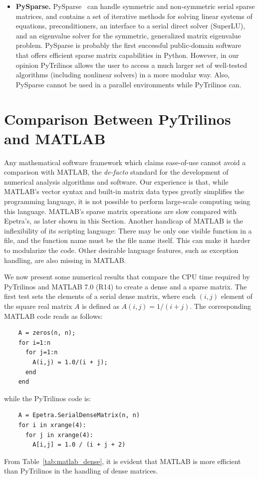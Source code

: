 \documentclass[acmtocl]{acmtrans2m}
\begin{document}
\begin{itemize}
  {\bf Why aren't we using ScientificPython?}

\item {\bf PySparse.}  PySparse~\cite{broker05using} can handle
  symmetric and non-symmetric serial sparse matrices, and contains a
  set of iterative methods for solving linear systems of equations,
  preconditioners, an interface to a serial direct solver (SuperLU),
  and an eigenvalue solver for the symmetric, generalized matrix
  eigenvalue problem.  PySparse is probably the first successful
  public-domain software that offers efficient sparse matrix
  capabilities in Python. However, in our opinion PyTrilinos allows
  the user to access a much larger set of well-tested algorithms
  (including nonlinear solvers) in a more modular way.  Also,
  PySparse cannot be used in a parallel environments while PyTrilinos
  can.

\end{itemize}

\section{Comparison Between PyTrilinos and MATLAB}
\label{sec:comparison_matlab}

Any mathematical software framework which claims ease-of-use cannot
avoid a comparison with MATLAB, the {\sl de-facto} standard for the
development of numerical analysis algorithms and software.  
Our
experience is that, while MATLAB's vector syntax and built-in matrix
data types greatly simplifies the programming language, it is not
possible to perform large-scale computing using this language.
MATLAB's sparse matrix operations are slow compared with Epetra's, as later
shown in this Section.
Another handicap of MATLAB is the inflexibility of its scripting
language: There may be only one visible function in a file, and the
function name must be the file name itself. This can make it harder to
modularize the code. Other desirable language features, such as
exception handling, are also missing in MATLAB.

We now present some numerical results that compare the CPU time required by
PyTrilinos and MATLAB 7.0 (R14) to create a dense and a sparse matrix. 
The first test sets the elements of a serial dense matrix, where each
$(i,j)$ element of the square real matrix $A$ is defined as $A(i,j) =
1/(i + j)$. The corresponding MATLAB code reads as follows:
\begin{verbatim}
    A = zeros(n, n);
    for i=1:n
      for j=1:n
        A(i,j) = 1.0/(i + j);
      end
    end
\end{verbatim}
while the PyTrilinos code is:
\begin{verbatim}
    A = Epetra.SerialDenseMatrix(n, n)
    for i in xrange(4):
      for j in xrange(4):
        A[i,j] = 1.0 / (i + j + 2)
\end{verbatim}
From Table~\ref{tab:matlab_dense}, it is evident that MATLAB is more
efficient than PyTrilinos in the handling of dense matrices.
\end{document}
